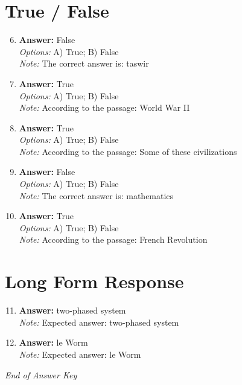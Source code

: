 \documentclass[12pt]{article}
\begin{document}
\section*{True / False}
\begin{enumerate}[label=\arabic*.]
\setcounter{enumi}{5}
\item \textbf{Answer:} False
\\ \textit{Options:} A) True; B) False
\\ \textit{Note:} The correct answer is: taswir
\item \textbf{Answer:} True
\\ \textit{Options:} A) True; B) False
\\ \textit{Note:} According to the passage: World War II
\item \textbf{Answer:} True
\\ \textit{Options:} A) True; B) False
\\ \textit{Note:} According to the passage: Some of these civilizations
\item \textbf{Answer:} False
\\ \textit{Options:} A) True; B) False
\\ \textit{Note:} The correct answer is: mathematics
\item \textbf{Answer:} True
\\ \textit{Options:} A) True; B) False
\\ \textit{Note:} According to the passage: French Revolution
\end{enumerate}

\section*{Long Form Response}
\begin{enumerate}[label=\arabic*.]
\setcounter{enumi}{10}
\item \textbf{Answer:} two-phased system
\\ \textit{Note:} Expected answer: two-phased system
\item \textbf{Answer:} le Worm
\\ \textit{Note:} Expected answer: le Worm
\end{enumerate}

\vfill
\noindent\textit{End of Answer Key}
\end{document}
